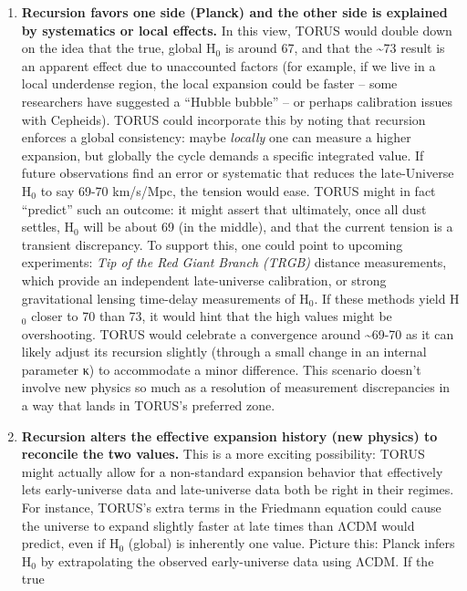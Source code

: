 \documentclass[]{article}
\newcommand{\subscript}[1]{\ensuremath{_{\mathrm{#1}}}}
\begin{document}
\begin{enumerate}
\def\labelenumi{\arabic{enumi}.}
\item
  \textbf{Recursion favors one side (Planck) and the other side is
  explained by systematics or local effects.} In this view, TORUS would
  double down on the idea that the true, global
  H\subscript{0} is around
  67, and that the \textasciitilde{}73 result is an apparent effect due
  to unaccounted factors (for example, if we live in a local underdense
  region, the local expansion could be faster -- some researchers have
  suggested a ``Hubble bubble'' -- or perhaps calibration issues with
  Cepheids). TORUS could incorporate this by noting that recursion
  enforces a global consistency: maybe \emph{locally} one can measure a
  higher expansion, but globally the cycle demands a specific integrated
  value. If future observations find an error or systematic that reduces
  the late-Universe
  H\subscript{0} to say
  69-70 km/s/Mpc, the tension would ease. TORUS might in fact
  ``predict'' such an outcome: it might assert that ultimately, once all
  dust settles,
  H\subscript{0} will be
  about 69 (in the middle)​, and that the current tension is a transient
  discrepancy. To support this, one could point to upcoming experiments:
  \emph{Tip of the Red Giant Branch (TRGB)} distance measurements, which
  provide an independent late-universe calibration, or strong
  gravitational lensing time-delay measurements of
  H\subscript{0}. If these
  methods yield
  H\subscript{0} closer to
  70 than 73, it would hint that the high values might be overshooting.
  TORUS would celebrate a convergence around \textasciitilde{}69-70 as
  it can likely adjust its recursion slightly (through a small change in
  an internal parameter κ) to accommodate a minor difference​. This
  scenario doesn't involve new physics so much as a resolution of
  measurement discrepancies in a way that lands in TORUS's preferred
  zone.
\item
  \textbf{Recursion alters the effective expansion history (new physics)
  to reconcile the two values.} This is a more exciting possibility:
  TORUS might actually allow for a non-standard expansion behavior that
  effectively lets early-universe data and late-universe data both be
  right in their regimes. For instance, TORUS's extra terms in the
  Friedmann equation could cause the universe to expand slightly faster
  at late times than ΛCDM would predict, even if
  H\subscript{0} (global)
  is inherently one value. Picture this: Planck infers
  H\subscript{0} by
  extrapolating the observed early-universe data using ΛCDM. If the true

\end{enumerate}
\end{document}
